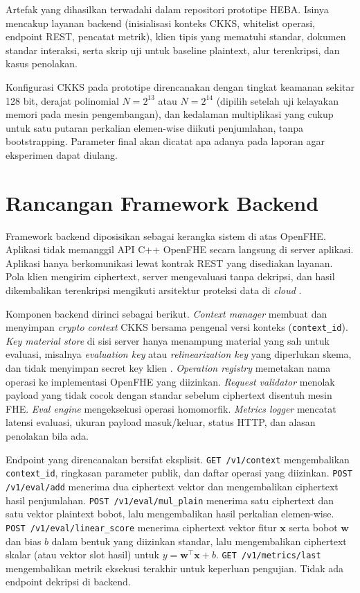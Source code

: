 \documentclass[12pt,a4paper,oneside]{report}
\begin{document}
Artefak yang dihasilkan terwadahi dalam repositori prototipe HEBA. Isinya mencakup layanan backend (inisialisasi konteks CKKS, whitelist operasi, endpoint REST, pencatat metrik), klien tipis yang mematuhi standar, dokumen standar interaksi, serta skrip uji untuk baseline plaintext, alur terenkripsi, dan kasus penolakan.

Konfigurasi CKKS pada prototipe direncanakan dengan tingkat keamanan sekitar 128 bit, derajat polinomial $N=2^{13}$ atau $N=2^{14}$ (dipilih setelah uji kelayakan memori pada mesin pengembangan), dan kedalaman multiplikasi yang cukup untuk satu putaran perkalian elemen-wise diikuti penjumlahan, tanpa bootstrapping. Parameter final akan dicatat apa adanya pada laporan agar eksperimen dapat diulang.

\section{Rancangan Framework Backend}

Framework backend diposisikan sebagai kerangka sistem di atas OpenFHE. Aplikasi tidak memanggil API C++ OpenFHE secara langsung di server aplikasi. Aplikasi hanya berkomunikasi lewat kontrak REST yang disediakan layanan. Pola klien mengirim ciphertext, server mengevaluasi tanpa dekripsi, dan hasil dikembalikan terenkripsi mengikuti arsitektur proteksi data di \emph{cloud} \cite{epishkina2025cloudHeArchitecture}.

Komponen backend dirinci sebagai berikut. \emph{Context manager} membuat dan menyimpan \emph{crypto context} CKKS bersama pengenal versi konteks (\texttt{context\_id}). \emph{Key material store} di sisi server hanya menampung material yang sah untuk evaluasi, misalnya \emph{evaluation key} atau \emph{relinearization key} yang diperlukan skema, dan tidak menyimpan secret key klien \cite{epishkina2025cloudHeArchitecture,vinko2026secureByDesign}. \emph{Operation registry} memetakan nama operasi ke implementasi OpenFHE yang diizinkan. \emph{Request validator} menolak payload yang tidak cocok dengan standar sebelum ciphertext disentuh mesin FHE. \emph{Eval engine} mengeksekusi operasi homomorfik. \emph{Metrics logger} mencatat latensi evaluasi, ukuran payload masuk/keluar, status HTTP, dan alasan penolakan bila ada.

Endpoint yang direncanakan bersifat eksplisit. \texttt{GET /v1/context} mengembalikan \texttt{context\_id}, ringkasan parameter publik, dan daftar operasi yang diizinkan. \texttt{POST /v1/eval/add} menerima dua ciphertext vektor dan mengembalikan ciphertext hasil penjumlahan. \texttt{POST /v1/eval/mul\_plain} menerima satu ciphertext dan satu vektor plaintext bobot, lalu mengembalikan hasil perkalian elemen-wise. \texttt{POST /v1/eval/linear\_score} menerima ciphertext vektor fitur $\mathbf{x}$ serta bobot $\mathbf{w}$ dan bias $b$ dalam bentuk yang diizinkan standar, lalu mengembalikan ciphertext skalar (atau vektor slot hasil) untuk $y=\mathbf{w}^{\top}\mathbf{x}+b$. \texttt{GET /v1/metrics/last} mengembalikan metrik eksekusi terakhir untuk keperluan pengujian. Tidak ada endpoint dekripsi di backend.
\end{document}
